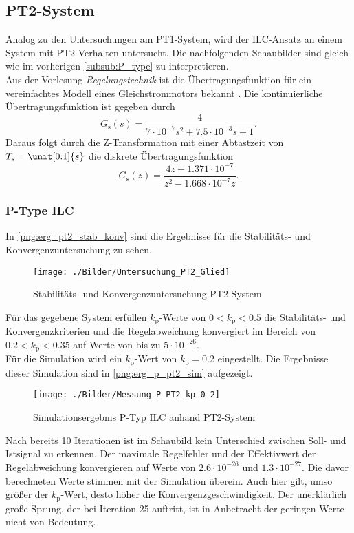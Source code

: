 \subsection{PT2-System}
Analog zu den Untersuchungen am PT1-System, wird der ILC-Ansatz an einem System mit PT2-Verhalten untersucht. Die nachfolgenden Schaubilder sind gleich wie im vorherigen \autoref{subsub:P_type} zu interpretieren. \\ 
Aus der Vorlesung \textit{Regelungstechnik} ist die Übertragungsfunktion für ein vereinfachtes Modell eines Gleichstrommotors bekannt \cite{Skript_Baur}. Die kontinuierliche Übertragungsfunktion ist gegeben durch
\begin{equation}
	\label{eq:ilc_Gs_pt2}
	G_\mathrm{s}(s) = \frac{4}{7 \cdot 10^{-7}s^2+7.5 \cdot 10^{-3}s + 1}.
\end{equation}
Daraus folgt durch die Z-Transformation mit einer Abtastzeit von $T_\mathrm{s} = \unit[0.1]{s}$ die diskrete Übertragungsfunktion
\begin{equation}
	\label{eq:ilc_Gz_pt2}
	G_\mathrm{s}(z) = \frac{4z + 1.371 \cdot 10^{-7}}{z^2 - 1.668 \cdot 10^{-7}z}.
\end{equation}
\subsubsection{P-Type ILC}
In \autoref{png:erg_pt2_stab_konv} sind die Ergebnisse für die Stabilitäts- und Konvergenzuntersuchung zu sehen.
\begin{figure}[H]
	\centering
	\texttt{[image: ./Bilder/Untersuchung\_PT2\_Glied]}
	\caption{Stabilitäts- und Konvergenzuntersuchung PT2-System}
	\label{png:erg_pt2_stab_konv}
\end{figure}
Für das gegebene System erfüllen $k_\mathrm{p}$-Werte von $0 < k_\mathrm{p} < 0.5$ die Stabilitäts- und Konvergenzkriterien und die Regelabweichung konvergiert im Bereich von $0.2 < k_\mathrm{p} < 0.35$ auf Werte von bis zu $5\cdot10^{-26}$.\\
Für die Simulation wird ein $k_\mathrm{p}$-Wert von $k_\mathrm{p} = 0.2$ eingestellt. Die Ergebnisse dieser Simulation sind in \autoref{png:erg_p_pt2_sim} aufgezeigt.
\begin{figure}[H]
	\centering
	\texttt{[image: ./Bilder/Messung\_P\_PT2\_kp\_0\_2]}
	\caption{Simulationsergebnis P-Typ ILC anhand PT2-System}
	\label{png:erg_p_pt2_sim}
\end{figure}
Nach bereits 10 Iterationen ist im Schaubild kein Unterschied zwischen Soll- und Istsignal zu erkennen. Der maximale Regelfehler und der Effektivwert der Regelabweichung konvergieren auf Werte von $2.6\cdot10^{-26}$ und $1.3\cdot10^{-27}$. Die davor berechneten Werte stimmen mit der Simulation überein. Auch hier gilt, umso größer der $k_\mathrm{p}$-Wert, desto höher die Konvergenzgeschwindigkeit. Der unerklärlich große Sprung, der bei Iteration 25 auftritt, ist in Anbetracht der geringen Werte nicht von Bedeutung.
